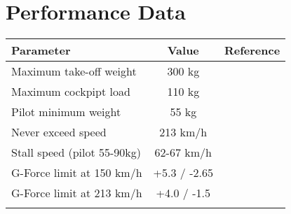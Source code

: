 \section{Performance Data}

\begin{tabularx}{\textwidth}{ | L | c | c | }
  \hline
  \textbf{Parameter}              & \textbf{Value} & \textbf{Reference} \\ \hline
  Maximum take-off weight         & 300 kg         & \cite{PW5_InstrukcjaUzytkowaniaWLocieSzybowca,EASA-A-449,Brzezinski1998} \\ \hline
  Maximum cockpipt load           & 110 kg         & \cite{PW5_InstrukcjaUzytkowaniaWLocieSzybowca,Brzezinski1998} \\ \hline
  Pilot minimum weight            &  55 kg         & \cite{PW5_InstrukcjaUzytkowaniaWLocieSzybowca,Brzezinski1998} \\ \hline
  Never exceed speed              & 213 km/h       & \cite{PW5_InstrukcjaUzytkowaniaWLocieSzybowca,EASA-A-449} \\ \hline
  Stall speed (pilot 55-90kg)     & 62-67 km/h     & \cite{PW5_InstrukcjaUzytkowaniaWLocieSzybowca} \\ \hline
  G-Force limit at 150 km/h       & +5.3 / -2.65   & \cite{PW5_InstrukcjaUzytkowaniaWLocieSzybowca,EASA-A-449,Brzezinski1998} \\ \hline
  G-Force limit at 213 km/h       & +4.0 / -1.5    & \cite{PW5_InstrukcjaUzytkowaniaWLocieSzybowca,EASA-A-449,Brzezinski1998} \\ \hline
  \caption{Performance data}
\end{tabularx}
